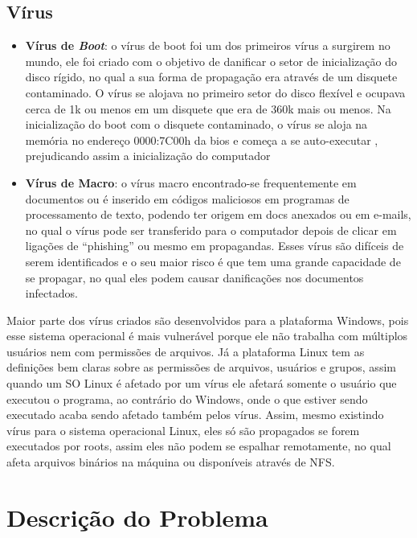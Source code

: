 \subsection{Vírus}

\begin{itemize}
  \item \textbf{Vírus de \textit{Boot}}: o vírus de boot foi um dos primeiros vírus a surgirem no mundo,
    ele foi criado com o objetivo de danificar o setor de inicialização do disco rígido,
    no qual a sua forma de propagação era através de um disquete contaminado. O vírus se
    alojava no primeiro setor do disco flexível e ocupava cerca de 1k ou menos em um
    disquete que era de 360k mais ou menos. Na inicialização do boot com o disquete
    contaminado, o vírus se aloja na memória no endereço 0000:7C00h da bios e começa
    a se auto-executar , prejudicando assim a inicialização do computador

  \item \textbf{Vírus de Macro}: o vírus macro encontrado-se frequentemente em documentos ou é
    inserido em códigos maliciosos em programas de processamento de texto, podendo ter
    origem em docs anexados ou em e-mails, no qual o vírus pode ser transferido para o
    computador depois de clicar em ligações de “phishing” ou mesmo em propagandas. Esses
    vírus são difíceis de serem identificados e o seu maior risco é que tem uma grande
    capacidade de se propagar, no qual eles podem causar danificações nos documentos infectados.
\end{itemize}

Maior parte dos vírus criados são desenvolvidos para a plataforma Windows, pois esse sistema operacional
é mais vulnerável porque ele não trabalha com múltiplos usuários nem com permissões de arquivos. Já a plataforma
Linux tem as definições bem claras sobre as permissões de arquivos, usuários e grupos, assim quando um SO Linux é
afetado por um vírus ele afetará somente o usuário que executou o programa, ao contrário do Windows, onde o que estiver
sendo executado acaba sendo afetado também pelos vírus. Assim, mesmo existindo vírus para o sistema operacional Linux, eles
só são propagados se forem executados por roots, assim eles não podem se espalhar remotamente, no qual afeta arquivos binários
na máquina ou disponíveis através de NFS.

%

\section{Descrição do Problema}

